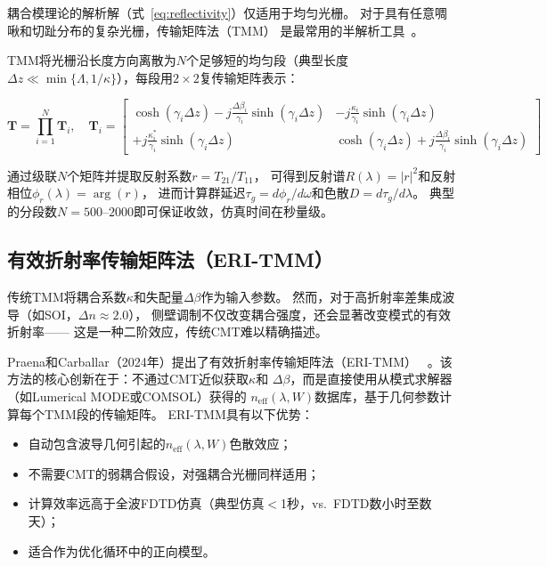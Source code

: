 \documentclass[12pt,a4paper,twoside]{article}
\begin{document}
耦合模理论的解析解（式~\ref{eq:reflectivity}）仅适用于均匀光栅。
对于具有任意啁啾和切趾分布的复杂光栅，传输矩阵法（TMM）
是最常用的半解析工具~\cite{strain2007,cheng2021}。

TMM将光栅沿长度方向离散为$N$个足够短的均匀段（典型长度$\Delta z \ll
\min\{\Lambda, 1/\kappa\}$），每段用$2\times2$复传输矩阵表示：

\begin{equation}
\mathbf{T} = \prod_{i=1}^{N} \mathbf{T}_i, \quad
\mathbf{T}_i =
\begin{bmatrix}
\cosh(\gamma_i\Delta z) - j\frac{\Delta\beta_i}{\gamma_i}\sinh(\gamma_i\Delta z) &
-j\frac{\kappa_i}{\gamma_i}\sinh(\gamma_i\Delta z) \\[4pt]
+j\frac{\kappa_i^*}{\gamma_i}\sinh(\gamma_i\Delta z) &
\cosh(\gamma_i\Delta z) + j\frac{\Delta\beta_i}{\gamma_i}\sinh(\gamma_i\Delta z)
\end{bmatrix}
\label{eq:tmm}
\end{equation}

通过级联$N$个矩阵并提取反射系数$r = T_{21}/T_{11}$，
可得到反射谱$R(\lambda) = |r|^2$和反射相位$\phi_r(\lambda) = \arg(r)$，
进而计算群延迟$\tau_g = d\phi_r/d\omega$和色散$D = d\tau_g/d\lambda$。
典型的分段数$N = 500$--$2000$即可保证收敛，仿真时间在秒量级。

\subsection{有效折射率传输矩阵法（ERI-TMM）}

传统TMM将耦合系数$\kappa$和失配量$\Delta\beta$作为输入参数。
然而，对于高折射率差集成波导（如SOI，$\Delta n \approx 2.0$），
侧壁调制不仅改变耦合强度，还会显著改变模式的有效折射率——
这是一种二阶效应，传统CMT难以精确描述。

Praena和Carballar（2024年）提出了有效折射率传输矩阵法（ERI-TMM）
~\cite{praena2024}。该方法的核心创新在于：不通过CMT近似获取$\kappa$和
$\Delta\beta$，而是直接使用从模式求解器（如Lumerical MODE或COMSOL）获得的
$n_{\text{eff}}(\lambda, W)$数据库，基于几何参数计算每个TMM段的传输矩阵。
ERI-TMM具有以下优势：

\begin{itemize}[leftmargin=*,itemsep=2pt]
\item 自动包含波导几何引起的$n_{\text{eff}}(\lambda, W)$色散效应；
\item 不需要CMT的弱耦合假设，对强耦合光栅同样适用；
\item 计算效率远高于全波FDTD仿真（典型仿真$<$1秒，vs.\ FDTD数小时至数天）；
\item 适合作为优化循环中的正向模型。
\end{itemize}
\end{document}
